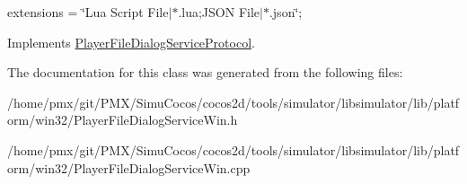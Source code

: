 extensions = \char`\"{}\+Lua Script File$\vert$$\ast$.\+lua;\+J\+S\+O\+N File$\vert$$\ast$.\+json\char`\"{}; 

Implements \hyperlink{classPlayerFileDialogServiceProtocol_ac9ef6f506a2ad68bcec05a0029b5cf83}{Player\+File\+Dialog\+Service\+Protocol}.



The documentation for this class was generated from the following files\+:\begin{DoxyCompactItemize}
\item 
/home/pmx/git/\+P\+M\+X/\+Simu\+Cocos/cocos2d/tools/simulator/libsimulator/lib/platform/win32/Player\+File\+Dialog\+Service\+Win.\+h\item 
/home/pmx/git/\+P\+M\+X/\+Simu\+Cocos/cocos2d/tools/simulator/libsimulator/lib/platform/win32/Player\+File\+Dialog\+Service\+Win.\+cpp\end{DoxyCompactItemize}
